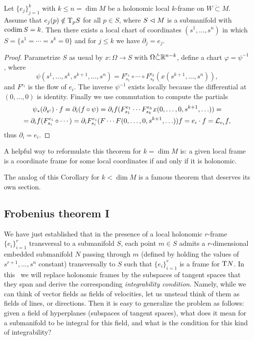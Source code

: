 \begin{thm}\label{thm rectification}
    Let $\{e_j\}_{j=1}^k$ with $k\leq n=\dim M$ be a holonomic local $k$-frame on $W\mathring{\subset}M$. Assume that $e_j(p)\notin \mathrm{T}_p S$ for all $p\in S$, where $S\vartriangleleft M$ is a submanifold with $\operatorname{codim} S=k$. Then there exists a local chart of coordinates $(s^1,\ldots,s^n)$ in which $S=\{s^1=\cdots=s^k=0\}$ and for $j\leq k$ we have $\partial_j=e_j$.
\end{thm}
\begin{proof}
    Parametrize $S$ as usual by $x:\Omega\to S$ with $\Omega\mathring{\subset}\mathbb{R}^{n-k}$, define a chart $\varphi=\psi^{-1}$, where
    \[\psi(s^1,\ldots,s^k,s^{k+1},\ldots,s^n)=F^{e_1}_{s_1}\circ\cdots\circ F^{e_k}_{s_k}(x(s^{k+1},\ldots,s^n)),\]
    and $F^{e_i}$ is the flow of $e_i$. The inverse $\psi^{-1}$ exists locally because the differential at $(0,\ldots,0)$ is identity. Finally we use commutation to compute the partials
    \begin{multline}
        \psi_\ast (\partial_{s^i})\cdot f=\partial_i(f\circ\psi)=\partial_i f(F^{e_1}_{s_1}\cdots F^{e_k}_{s_k} x(0,\ldots,0,s^{k+1},\ldots))=\\=\partial_i f(F^{e_i}_{s_i}\circ\cdots )=\partial_i F^{e_i}_{s_i}(F\cdots F(0,\ldots,0,s^{k+1},\ldots))f=e_i\cdot f=\mathcal{L}_{e_i}f,
    \end{multline}
    thus $\partial_i=e_i$.
\end{proof}

\begin{cor}
    A helpful way to reformulate this theorem for $k=\dim M$ is: a given local frame is a coordinate frame for some local coordinates if and only if it is holonomic.
\end{cor}

The analog of this Corollary for $k<\dim M$ is a famous theorem that deserves its own section.





\subsection{Frobenius theorem I}\label{sec: frobenius i}

We have just established that in the presence of a local holonomic $r$-frame $\{e_i\}_{i=1}^r$ transversal to a submanifold $S$, each point $m\in S$ admits a $r$-dimensional embedded submanifold $N$ passing through $m$ (defined by holding the values of $s^{r+1},\ldots,s^n$ constant) transversally to $S$ such that $\{e_i\}_{i=1}^r$ is a frame for $\mathrm{T} N$. In this \subsect\ we will replace holonomic frames by the subspaces of tangent spaces that they span and derive the corresponding \emph{integrability condition}. Namely, while we can think of vector fields as fields of velocities, let us unstead think of them as fields of lines, or directions. Then it is easy to generalize the problem as follows: given a field of hyperplanes (subspaces of tangent spaces), what does it mean for a submanifold to be integral for this field, and what is the condition for this kind of integrability?

